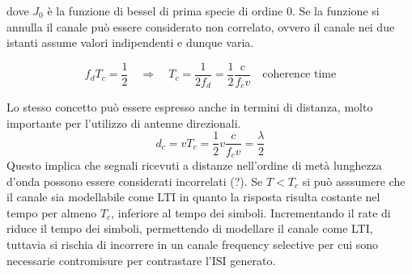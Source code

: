 dove $J_0$ è la funzione di bessel di prima specie di ordine 0.  Se la funzione si annulla il canale può essere considerato non correlato, ovvero il canale nei due istanti assume valori indipendenti e dunque varia.

\[
    f_d T_c = \frac{1}{2} \quad \Rightarrow \quad  T_c = \frac{1}{2 f_d} = \frac{1}{2} \frac{c}{f_c v} \quad \text{coherence time}
\]

Lo stesso concetto può essere espresso anche in termini di distanza, molto importante per l'utilizzo di antenne direzionali.
\[
    d_c = v T_c = \frac{1}{2} v \frac{c}{f_c v} = \frac{\lambda}{2}
\]
Questo implica che segnali ricevuti a distanze nell'ordine di metà lunghezza d'onda possono essere considerati incorrelati (?).
Se $T < T_c$ si può asssumere che il canale sia modellabile come LTI in quanto la risposta risulta costante nel tempo per almeno $T_c$, inferiore al tempo dei simboli.
Incrementando il rate di riduce il tempo dei simboli, permettendo di modellare il canale come LTI, tuttavia si rischia di incorrere in un canale frequency selective per cui sono necessarie contromisure per contrastare l'ISI generato.




